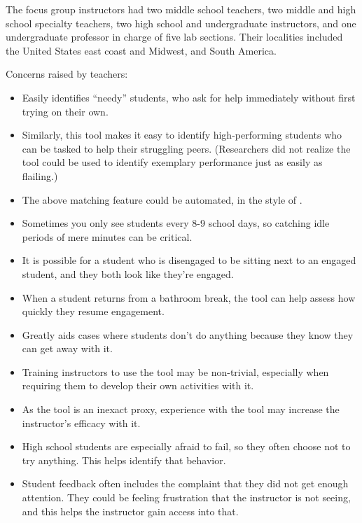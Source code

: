 The focus group instructors had two middle school teachers, two middle and high school specialty teachers, two high school and undergraduate instructors, and one undergraduate professor in charge of five lab sections. Their localities included the United States east coast and Midwest, and South America. 

Concerns raised by teachers: 
\begin{itemize}
\item Easily identifies ``needy'' students, who ask for help immediately without first trying on their own. %
\item Similarly, this tool makes it easy to identify high-performing students who can be tasked to help their struggling peers. (Researchers did not realize the tool could be used to identify exemplary performance just as easily as flailing.) 
\item The above matching feature could be automated, in the style of \citet{Diana:2017:IDR:3027385.3027441}.
\item Sometimes you only see students every 8-9 school days, so catching idle periods of mere minutes can be critical. 
\item It is possible for a student who is disengaged to be sitting next to an engaged student, and they both look like they're engaged.
\item When a student returns from a bathroom break, the tool can help assess how quickly they resume engagement.
\item Greatly aids cases where students don't do anything because they know they can get away with it.
\item Training instructors to use the tool may be non-trivial, especially when requiring them to develop their own activities with it. 
\item As the tool is an inexact proxy, experience with the tool may increase the instructor's efficacy with it.
\item High school students are especially afraid to fail, so they often choose not to try anything. This helps identify that behavior.
\item Student feedback often includes the complaint that they did not get enough attention. They could be feeling frustration that the instructor is not seeing, and this helps the instructor gain access into that.
\end{itemize}

